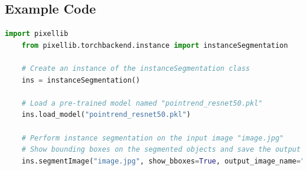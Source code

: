 \subsection{Example Code}
\begin{lstlisting}[language=Python]
    import pixellib
    from pixellib.torchbackend.instance import instanceSegmentation
    
    # Create an instance of the instanceSegmentation class
    ins = instanceSegmentation()
    
    # Load a pre-trained model named "pointrend_resnet50.pkl"
    ins.load_model("pointrend_resnet50.pkl")
    
    # Perform instance segmentation on the input image "image.jpg"
    # Show bounding boxes on the segmented objects and save the output as "output_image.jpg"
    ins.segmentImage("image.jpg", show_bboxes=True, output_image_name="output_image.jpg")
\end{lstlisting}




